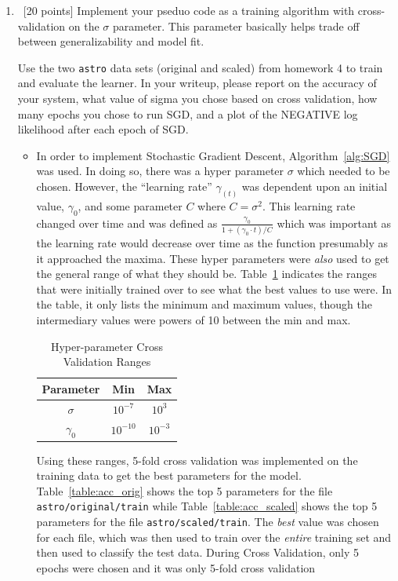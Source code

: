 \begin{enumerate}
\item ~[20 points] Implement your pseduo code as a training algorithm with
  cross-validation on the $\sigma$ parameter.  This parameter
  basically helps trade off between generalizability and model fit.  

  Use the two {\tt astro} data sets (original and scaled) from
  homework 4 to train and evaluate the learner. In your writeup,
  please report on the accuracy of your system, what value of sigma
  you chose based on cross validation, how many epochs you chose to
  run SGD, and a plot of the NEGATIVE log likelihood after each epoch
  of SGD. %

\begin{itemize}
\item In order to implement Stochastic Gradient Descent, Algorithm~\ref{alg:SGD} was used. In doing so, there was a hyper parameter $\sigma$ which needed to be chosen. However, the ``learning rate'' $\gamma_{(t)}$ was dependent upon an initial value, $\gamma_{0}$, and some parameter $C$ where $C=\sigma^{2}$. This learning rate changed over time and was defined as $\frac{\gamma_{0}}{1+(\gamma_{0}\cdot t)/C}$ which was important as the learning rate would decrease over time as the function presumably as it approached the maxima. These hyper parameters were {\em also} used to get the general range of what they should be. Table~\ref{table:hp_range} indicates the ranges that were initially trained over to see what the best values to use were. In the table, it only lists the minimum and maximum values, though the intermediary values were powers of 10 between the min and max. 

\begin{table}[!h]
\centering
\begin{tabular}{c | c c}
\hline\hline
{\bf Parameter} & {\bf Min} & {\bf Max}\\
\hline
$\sigma$ & $10^{-7}$ & $10^{3}$\\
$\gamma_{0}$ & $10^{-10}$ & $10^{-3}$\\
\hline
\end{tabular}
\caption{Hyper-parameter Cross Validation Ranges}
\label{table:hp_range}
\end{table}

Using these ranges, 5-fold cross validation was implemented on the training data to get the best parameters for the model. Table~\ref{table:acc_orig} shows the top 5 parameters for the file \verb~astro/original/train~ while Table~\ref{table:acc_scaled} shows the top 5 parameters for the file \verb~astro/scaled/train~. The {\em best} value was chosen for each file, which was then used to train over the {\em entire} training set and then used to classify the test data. During Cross Validation, only 5 epochs were chosen and it was only 5-fold cross validation


\end{itemize}
\end{enumerate}
